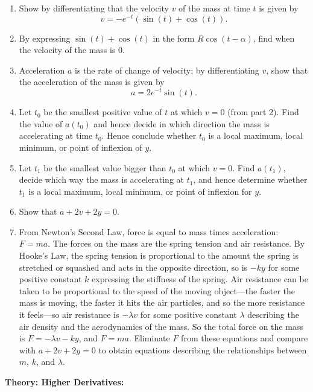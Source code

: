 \documentclass{article}
\begin{document}
\begin{enumerate}
	\item Show by differentiating that the velocity $v$ of the mass at time $t$ is given by
		\[v=-e^{- t}\left(\sin( t)+\cos(t)\right).\]
	\item By expressing $\sin(t)+\cos(t)$ in the form $R\cos(t-\alpha)$, find when the velocity of the mass is 0.
	\item Acceleration $a$ is the rate of change of velocity; by differentiating $v$, show that the acceleration of the mass is given by
		\[a=2e^{- t}\sin(t).\]
	\item Let $t_0$ be the smallest positive value of $t$ at which $v=0$ (from part 2). Find the value of $a(t_0)$ and hence decide in which direction the mass is accelerating at time $t_0$. Hence conclude whether $t_0$ is a local maximum, local minimum, or point of inflexion of $y$.
	\item Let $t_1$ be the smallest value bigger than $t_0$ at which $v=0$. Find $a(t_1)$, decide which way the mass is accelerating at $t_1$, and hence determine whether $t_1$ is a local maximum, local minimum, or point of inflexion for $y$.
	\item Show that $a+2v+2y=0$.
	\item From Newton's Second Law, force is equal to mass times acceleration: $F=ma$. The forces on the mass are the spring tension and air resistance. By Hooke's Law, the spring tension is proportional to the amount the spring is stretched or squashed and acts in the opposite direction, so is $-ky$ for some positive constant $k$ expressing the stiffness of the spring. Air resistance can be taken to be proportional to the speed of the moving object---the faster the mass is moving, the faster it hits the air particles, and so the more resistance it feels---so air resistance is $-\lambda v$ for some positive constant $\lambda$ describing the air density and the aerodynamics of the mass. So the total force on the mass is $F=-\lambda v-ky$, and $F=ma$. Eliminate $F$ from these equations and compare with $a+2v+2y=0$ to obtain equations describing the relationships between $m$, $k$, and $\lambda$. 
\end{enumerate}






\clearpage



\textbf{Theory: Higher Derivatives:}

\vspace{5mm}
\end{document}
